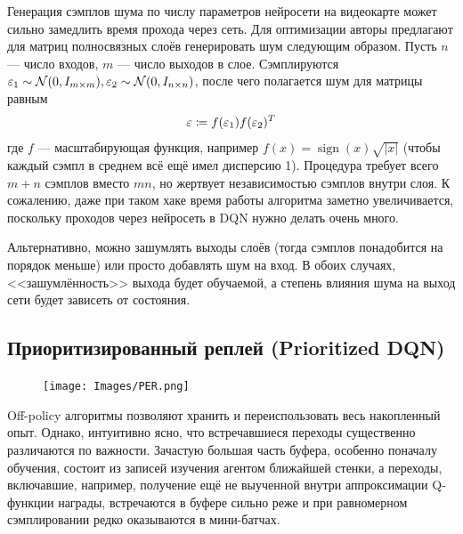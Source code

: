 \begin{remark}
Генерация сэмплов шума по числу параметров нейросети на видеокарте может сильно замедлить время прохода через сеть. Для оптимизации авторы предлагают для матриц полносвязных слоёв генерировать шум следующим образом. Пусть $n$ --- число входов, $m$ --- число выходов в слое. Сэмплируются $\varepsilon_1 \sim \mathcal{N}(0, I_{m \times m}), \varepsilon_2 \sim \mathcal{N}(0, I_{n \times n})$, после чего полагается шум для матрицы равным
$$\varepsilon \coloneqq f(\varepsilon_1) f(\varepsilon_2)^T$$
где $f$ --- масштабирующая функция, например $f(x) = \operatorname{sign}(x)\sqrt{|x|}$ (чтобы каждый сэмпл в среднем всё ещё имел дисперсию 1). Процедура требует всего $m + n$ сэмплов вместо $mn$, но жертвует независимостью сэмплов внутри слоя. К сожалению, даже при таком хаке время работы алгоритма заметно увеличивается, поскольку проходов через нейросеть в DQN нужно делать очень много.
\end{remark}

\begin{remark}
Альтернативно, можно зашумлять выходы слоёв (тогда сэмплов понадобится на порядок меньше) или просто добавлять шум на вход. В обоих случаях, <<зашумлённость>> выхода будет обучаемой, а степень влияния шума на выход сети будет зависеть от состояния.
\end{remark}

\subsection{Приоритизированный реплей (Prioritized DQN)}\label{subsec:prioritizedreplay}


\begin{figure}
\vspace{-0.3cm}
\centering
\texttt{[image: Images/PER.png]}
\vspace{-0.3cm}
\end{figure}

Off-policy алгоритмы позволяют хранить и переиспользовать весь накопленный опыт. Однако, интуитивно ясно, что встречавшиеся переходы существенно различаются по важности. Зачастую большая часть буфера, особенно поначалу обучения, состоит из записей изучения агентом ближайшей стенки, а переходы, включавшие, например, получение ещё не выученной внутри аппроксимации Q-функции награды, встречаются в буфере сильно реже и при равномерном сэмплировании редко оказываются в мини-батчах.

